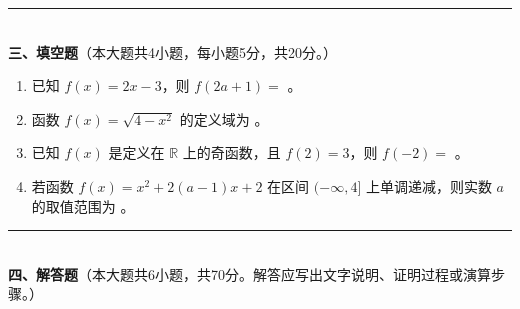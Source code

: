 \documentclass[12pt, a4paper]{ctexart}
\begin{document}
\vspace{6pt}

\noindent\rule{\textwidth}{0.4pt}\\[2pt]
{\large\bfseries 三、填空题}（本大题共4小题，每小题5分，共20分。）

\vspace{6pt}

\begin{enumerate}[resume]
\item 已知 $f(x)=2x-3$，则 $f(2a+1)=$ \underline{\hspace{3cm}}。

\item 函数 $f(x)=\sqrt{4-x^2}$ 的定义域为 \underline{\hspace{3cm}}。

\item 已知 $f(x)$ 是定义在 $\mathbb{R}$ 上的奇函数，且 $f(2)=3$，则 $f(-2)=$ \underline{\hspace{2cm}}。

\item 若函数 $f(x)=x^2+2(a-1)x+2$ 在区间 $(-\infty,4]$ 上单调递减，则实数 $a$ 的取值范围为 \underline{\hspace{3cm}}。
\end{enumerate}

\vspace{6pt}

\noindent\rule{\textwidth}{0.4pt}\\[2pt]
{\large\bfseries 四、解答题}（本大题共6小题，共70分。解答应写出文字说明、证明过程或演算步骤。）

\vspace{6pt}
\end{document}
